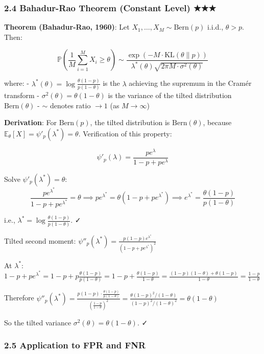 \documentclass[
  12pt,
]{ctexart}
\begin{document}
\subsubsection{2.4 Bahadur-Rao Theorem (Constant Level) ★★★}\label{bahadur-rao-theorem-constant-level}

\textbf{Theorem (Bahadur-Rao, 1960)}: Let \(X_1, \dots, X_M \sim \text{Bern}(p)\) i.i.d., \(\theta > p\). Then:

\[\mathbb{P}\left(\frac{1}{M}\sum_{i=1}^M X_i \geq \theta\right) \sim \frac{\exp(-M \cdot \text{KL}(\theta \| p))}{\lambda^*(\theta) \sqrt{2\pi M \cdot \sigma^2(\theta)}}\]

where:
- \(\lambda^*(\theta) = \log\frac{\theta(1-p)}{p(1-\theta)}\) is the \(\lambda\) achieving the supremum in the Cramér transform
- \(\sigma^2(\theta) = \theta(1-\theta)\) is the variance of the tilted distribution \(\text{Bern}(\theta)\)
- \(\sim\) denotes ratio \(\to 1\) (as \(M \to \infty\))

\textbf{Derivation}: For \(\text{Bern}(p)\), the tilted distribution is \(\text{Bern}(\theta)\), because \(\mathbb{E}_{\theta}[X] = \psi'_p(\lambda^*) = \theta\). Verification of this property:

\[\psi'_p(\lambda) = \frac{pe^\lambda}{1-p+pe^\lambda}\]

Solve \(\psi'_p(\lambda^*) = \theta\):
\[\frac{pe^{\lambda^*}}{1-p+pe^{\lambda^*}} = \theta \implies pe^{\lambda^*} = \theta(1-p+pe^{\lambda^*}) \implies e^{\lambda^*} = \frac{\theta(1-p)}{p(1-\theta)}\]

i.e., \(\lambda^* = \log\frac{\theta(1-p)}{p(1-\theta)}\). ✓

Tilted second moment:
\(\psi''_p(\lambda^*) = \frac{p(1-p)e^{\lambda^*}}{(1-p+pe^{\lambda^*})^2}\)

At \(\lambda^*\):
\(1-p+pe^{\lambda^*} = 1-p + p\frac{\theta(1-p)}{p(1-\theta)} = 1-p + \frac{\theta(1-p)}{1-\theta} = \frac{(1-p)(1-\theta) + \theta(1-p)}{1-\theta} = \frac{1-p}{1-\theta}\)

Therefore
\(\psi''_p(\lambda^*) = \frac{p(1-p) \cdot \frac{\theta(1-p)}{p(1-\theta)}}{(\frac{1-p}{1-\theta})^2} = \frac{\theta(1-p)^2/(1-\theta)}{(1-p)^2/(1-\theta)^2} = \theta(1-\theta)\)

So the tilted variance \(\sigma^2(\theta) = \theta(1-\theta)\). ✓

\subsubsection{2.5 Application to FPR and FNR}\label{application-to-fpr-and-fnr}
\end{document}
